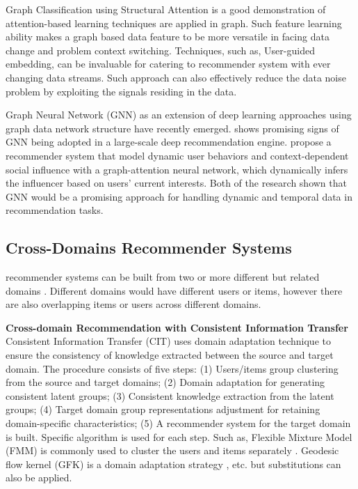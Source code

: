 Graph Classification using Structural Attention \citep{lee2018graph} is a good demonstration of attention-based learning techniques are applied in graph. Such feature learning ability makes a graph based data feature to be more versatile in facing data change and problem context switching. 
Techniques, such as, User-guided embedding, can be invaluable for catering to recommender system with ever changing data streams. Such approach can also effectively reduce the data noise problem by exploiting the signals residing in the data.  

Graph Neural Network (GNN) as an extension of deep learning approaches using graph data network structure have recently emerged. \citet{ying2018graph} shows promising signs of GNN being adopted in a large-scale deep recommendation engine. \citet{song2019session} propose a recommender system that model dynamic user behaviors and context-dependent social influence with a graph-attention neural network, which dynamically infers the influencer based on users’ current interests. Both of the research shown that GNN would be a promising approach for handling dynamic and temporal data in recommendation tasks.

\subsection{Cross-Domains Recommender Systems}
recommender systems can be built from two or more different but related domains \citep{fernandez2012cross}. Different domains would have different users or items, however there are also overlapping items or users across different domains. 

\bigskip
\textbf{Cross-domain Recommendation with Consistent Information Transfer}
Consistent Information Transfer (CIT) uses domain adaptation technique to ensure the consistency of knowledge extracted between the source and target domain. 
The procedure consists of five steps: (1) Users/items group clustering from the source and target domains; (2) Domain adaptation for generating consistent latent groups; (3) Consistent knowledge extraction from the latent groups; (4) Target domain group representations adjustment for retaining domain-specific characteristics; (5) A recommender system for the target domain is built. Specific algorithm is used for each step. Such as, Flexible Mixture Model (FMM) is commonly used to cluster the users and items separately \citep{si2003flexible}. Geodesic flow kernel (GFK) is a domain adaptation strategy \citep{gong2014learning}, etc. but substitutions can also be applied.

